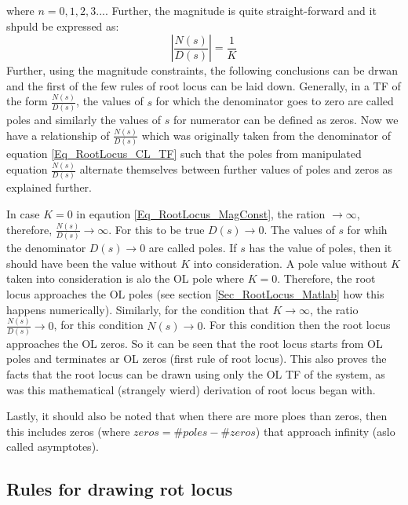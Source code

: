 where $n = 0,1,2,3...$. Further, the magnitude is quite straight-forward and it shpuld be expressed as:
\begin{equation}\label{Eq_RootLocus_MagConst}
	\left|\frac{N(s)}{D(s)} \right| = \frac{1}{K}
\end{equation}
Further, using the magnitude constraints, the following conclusions can be drwan and the first of the few rules of root locus can be laid down. Generally, in a TF of the form $\frac{N(s)}{D(s)}$, the values of $s$ for which the denominator goes to zero are called poles and similarly the values of $s$ for numerator can be defined as zeros. Now we have a relationship of $\frac{N(s)}{D(s)}$ which was originally taken from the denominator of equation \ref{Eq_RootLocus_CL_TF} such that the poles from manipulated equation $\frac{N(s)}{D(s)}$ alternate themselves between further values of poles and zeros as explained further.

In case $K = 0$ in eqaution \eqref{Eq_RootLocus_MagConst}, the ration $\rightarrow \infty$, therefore, $\frac{N(s)}{D(s)} \rightarrow \infty$. For this to be true $D(s) \rightarrow 0$. The values of $s$ for whih the denominator $D(s) \rightarrow 0$ are called poles. If $s$ has the value of poles, then it should have been the value without $K$ into consideration. A pole value without $K$ taken into consideration is alo the OL pole where $K = 0$. Therefore, the root locus approaches the OL poles (see section \ref{Sec_RootLocus_Matlab} how this happens numerically). Similarly, for the condition that $K \rightarrow \infty$, the ratio $\frac{N(s)}{D(s)} \rightarrow 0$, for this condition $N(s) \rightarrow 0$. For this condition then the root locus approaches the OL zeros. So it can be seen that the root locus starts from OL poles and terminates ar OL zeros (first rule of root locus). This also proves the facts that the root locus can be drawn using only the OL TF of the system, as was this mathematical (strangely wierd) derivation of root locus began with. 

Lastly, it should also be noted that when there are more ploes than zeros, then this includes zeros (where $zeros = \# poles - \# zeros$) that approach infinity (aslo called asymptotes).

\subsection{Rules for drawing rot locus}

